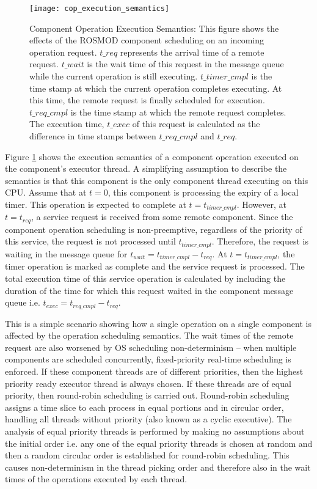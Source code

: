 \begin{figure}[ht]
	\centering
	\texttt{[image: cop\_execution\_semantics]}
	\caption{Component Operation Execution Semantics: This figure shows the effects of the ROSMOD component scheduling on an incoming operation request. $t\_{req}$ represents the arrival time of a remote request. $t\_{wait}$ is the wait time of this request in the message queue while the current operation is still executing. $t\_{timer\_cmpl}$ is the time stamp at which the current operation completes executing. At this time, the remote request is finally scheduled for execution. $t\_{req\_cmpl}$ is the time stamp at which the remote request completes. The execution time, $t\_{exec}$ of this request is calculated as the difference in time stamps between $t\_{req\_cmpl}$ and $t\_{req}$.}
	\label{fig:cop_execution_semantics}
\end{figure}

Figure \ref{fig:cop_execution_semantics} shows the execution semantics of a component operation executed on the component's executor thread. A simplifying assumption  to describe the semantics is that this component is the only component thread executing on this CPU. Assume that at $t=0$, this component is processing the expiry of a local timer. This operation is expected to complete at $t = t_{timer\_cmpl}$. However, at $t = t_{req}$, a service request is received from some remote component. Since the component operation scheduling is non-preemptive, regardless of the priority of this service, the request is not processed until $t_{timer\_cmpl}$. Therefore, the request is waiting in the message queue for $t_{wait} = t_{timer\_cmpl} - t_{req}$. At $t = t_{timer\_cmpl}$, the timer operation is marked as complete and the service request is processed. The total execution time of this service operation is calculated by including the duration of the time for which this request waited in the component message queue i.e. $t_{exec} = t_{req\_cmpl} - t_{req}$. 

This is a simple scenario showing how a single operation on a single component is affected by the operation scheduling semantics. The wait times of the remote request are also worsened by OS scheduling non-determinism -- when multiple components are scheduled concurrently, fixed-priority real-time scheduling is enforced. If these component threads are of different priorities, then the highest priority ready executor thread is always chosen. If these threads are of equal priority, then round-robin scheduling is carried out. Round-robin scheduling assigns a time slice to each process in equal portions and in circular order, handling all threads without priority (also known as a cyclic executive). The analysis of equal priority threads is performed by making no assumptions about the initial order i.e. any one of the equal priority threads is chosen at random and then a random circular order is established for round-robin scheduling. This causes non-determinism in the thread picking order and therefore also in the wait times of the operations executed by each thread. 

